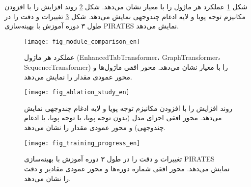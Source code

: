 شکل \ref{fig:module_comparison} عملکرد هر ماژول را با معیار  نشان می‌دهد. شکل \ref{fig:ablation_study} روند افزایش  را با افزودن مکانیزم توجه پویا و لایه ادغام چندوجهی نمایش می‌دهد. شکل \ref{fig:training_progress} تغییرات  و دقت را در طول ۳ دوره آموزش با بهینه‌سازی PIRATES نمایش می‌دهد.

\begin{figure}[h!]
\centering
\texttt{[image: fig\_module\_comparison\_en]}
\caption{عملکرد هر ماژول (EnhancedTabTransformer، GraphTransformer، SequenceTransformer) را با معیار  نشان می‌دهد. محور افقی ماژول‌ها و محور عمودی مقدار  را نمایش می‌دهد.}
\label{fig:module_comparison}
\end{figure}

\begin{figure}[h!]
\centering
\texttt{[image: fig\_ablation\_study\_en]}
\caption{روند افزایش  را با افزودن مکانیزم توجه پویا و لایه ادغام چندوجهی نمایش می‌دهد. محور افقی اجزای مدل (بدون توجه پویا، با توجه پویا، با ادغام چندوجهی) و محور عمودی مقدار  را نشان می‌دهد.}
\label{fig:ablation_study}
\end{figure}

\begin{figure}[h!]
\centering
\texttt{[image: fig\_training\_progress\_en]}
\caption{تغییرات  و دقت را در طول ۳ دوره آموزش با بهینه‌سازی PIRATES نمایش می‌دهد. محور افقی شماره دوره‌ها و محور عمودی مقادیر  و دقت را نشان می‌دهد.}
\label{fig:training_progress}
\end{figure}

     
     
     
     
     
     
     
     
     
     
     
     